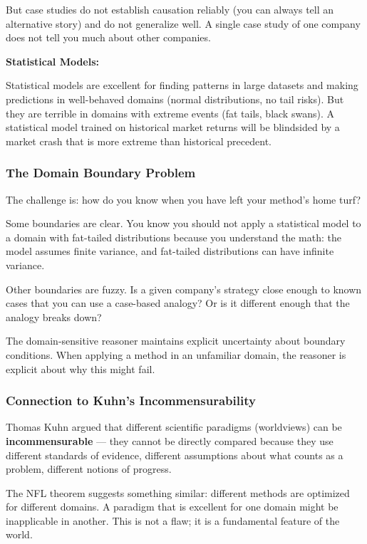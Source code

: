 \documentclass[11pt,letterpaper]{article}
\begin{document}
But case studies do not establish causation reliably (you can always tell an alternative story) and do not generalize well. A single case study of one company does not tell you much about other companies.

\textbf{Statistical Models:}

Statistical models are excellent for finding patterns in large datasets and making predictions in well-behaved domains (normal distributions, no tail risks). But they are terrible in domains with extreme events (fat tails, black swans). A statistical model trained on historical market returns will be blindsided by a market crash that is more extreme than historical precedent.

\subsubsection*{The Domain Boundary Problem}

The challenge is: how do you know when you have left your method's home turf?

Some boundaries are clear. You know you should not apply a statistical model to a domain with fat-tailed distributions because you understand the math: the model assumes finite variance, and fat-tailed distributions can have infinite variance.

Other boundaries are fuzzy. Is a given company's strategy close enough to known cases that you can use a case-based analogy? Or is it different enough that the analogy breaks down?

The domain-sensitive reasoner maintains explicit uncertainty about boundary conditions. When applying a method in an unfamiliar domain, the reasoner is explicit about why this might fail.

\subsubsection*{Connection to Kuhn's Incommensurability}

Thomas Kuhn argued that different scientific paradigms (worldviews) can be \textbf{incommensurable} — they cannot be directly compared because they use different standards of evidence, different assumptions about what counts as a problem, different notions of progress.

The NFL theorem suggests something similar: different methods are optimized for different domains. A paradigm that is excellent for one domain might be inapplicable in another. This is not a flaw; it is a fundamental feature of the world.
\end{document}
